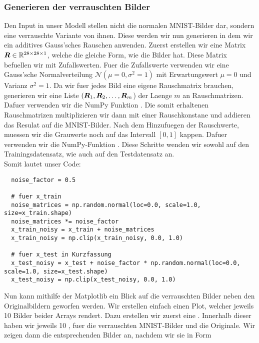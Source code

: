 \subsubsection{Generieren der verrauschten Bilder}
Den Input in unser Modell stellen nicht die normalen MNIST-Bilder dar, sondern
eine verrauschte Variante von ihnen. Diese werden wir nun generieren in dem wir
ein additives Gauss'sches Rauschen anwenden.
\para{}
Zuerst erstellen wir eine Matrix $\bm{R} \in \mathbb{R}^{28 \times 28 \times 1}$, welche die gleiche Form, wie die
Bilder hat. Diese Matrix befuellen wir mit Zufallswerten. Fuer die
Zufallswerte verwenden wir eine Gauss'sche Normalverteilung
$\mathcal{N}(\mu = 0, \sigma^2 = 1)$ mit Erwartungswert $\mu = 0$ und Varianz
$\sigma^2 = 1$. Da wir fuer jedes Bild eine eigene Rauschmatrix brauchen,
generieren wir eine Liste $(\bm{R}_1,\bm{R}_2,\ldots,\bm{R}_m$) der Laenge $m$ an
Rauschmatrizen. Dafuer verwenden wir die NumPy Funktion
.
Die somit erhaltenen Rauschmatrizen multiplizieren wir dann mit einer
Rauschkonstane  und addieren das Resulat auf die MNIST-Bilder.
Nach dem Hinzufuegen der Rauschwerte, muessen wir die Grauwerte noch auf das Intervall
$[0,1]$ kappen. Dafuer verwenden wir die NumPy-Funktion . Diese Schritte wenden
wir sowohl auf den Trainingsdatensatz, wie auch auf den Testdatensatz an. \\
Somit lautet unser Code:
\begin{verbatim}
  noise_factor = 0.5

  # fuer x_train
  noise_matrices = np.random.normal(loc=0.0, scale=1.0, size=x_train.shape)
  noise_matrices *= noise_factor
  x_train_noisy = x_train + noise_matrices
  x_train_noisy = np.clip(x_train_noisy, 0.0, 1.0)

  # fuer x_test in Kurzfassung
  x_test_noisy = x_test + noise_factor * np.random.normal(loc=0.0, scale=1.0, size=x_test.shape)
  x_test_noisy = np.clip(x_test_noisy, 0.0, 1.0)
\end{verbatim}
\para{}
Nun kann mithilfe der Matplotlib ein Blick auf die verrauschten Bilder
neben den Originalbildern geworfen werden. Wir erstellen einfach einen Plot, welcher
jeweils 10 Bilder beider Arrays rendert. \para{}
Dazu erstellen wir zuerst eine . Innerhalb dieser haben wir
jeweils 10 , fuer die verrauschten MNIST-Bilder und die
Originale. Wir zeigen dann die entsprechenden Bilder an, nachdem wir sie in Form
